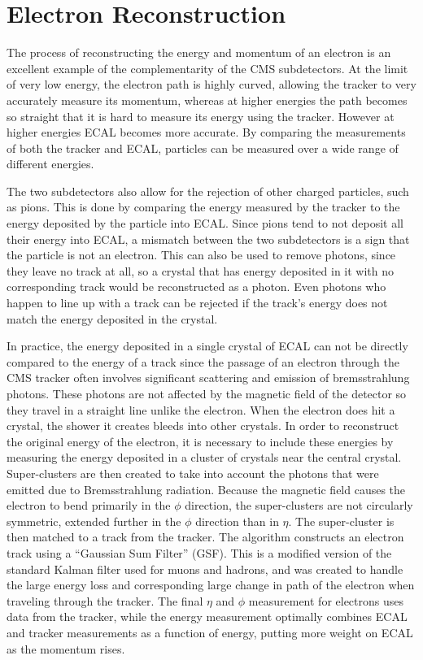 \section{Electron Reconstruction} 
The process of reconstructing the energy and momentum of an electron is an excellent example of the complementarity of the CMS subdetectors. At the limit of very low energy, the electron path is highly curved, allowing the tracker to very accurately measure its momentum, whereas at higher energies the path becomes so straight that it is hard to measure its energy using the tracker. However at higher energies ECAL becomes more accurate. By comparing the measurements of both the tracker and ECAL, particles can be measured over a wide range of different energies.

The two subdetectors also allow for the rejection of other charged particles, such as pions. This is done by comparing the energy measured by the tracker to the energy deposited by the particle into ECAL. Since pions tend to not deposit all their energy into ECAL, a mismatch between the two subdetectors is a sign that the particle is not an electron. This can also be used to remove photons, since they leave no track at all, so a crystal that has energy deposited in it with no corresponding track would be reconstructed as a photon. Even photons who happen to line up with a track can be rejected if the track's energy does not match the energy deposited in the crystal.

In practice, the energy deposited in a single crystal of ECAL can not be directly compared to the energy of a track since the passage of an electron through the CMS tracker often involves significant scattering and emission of bremsstrahlung photons. These photons are not affected by the magnetic field of the detector so they travel in a straight line unlike the electron. When the electron does hit a crystal, the shower it creates bleeds into other crystals. In order to reconstruct the original energy of the electron, it is necessary to include these energies by measuring the energy deposited in a cluster of crystals near the central crystal. Super-clusters are then created to take into account the photons that were emitted due to Bremsstrahlung radiation. Because the magnetic field causes the electron to bend primarily in the  $\phi$ direction, the super-clusters are not circularly symmetric, extended further in the $\phi$ direction than in $\eta$. The super-cluster is then matched to a track from the tracker. The algorithm constructs an electron track using a “Gaussian Sum Filter” (GSF)\cite{adam_2005}. This is a modified version of the standard Kalman filter used for muons and hadrons, and was created to handle the large energy loss and corresponding large change in path of the electron when traveling through the tracker. The final $\eta$ and $\phi$ measurement for electrons uses data from the tracker, while the energy measurement optimally combines ECAL and tracker measurements as a function of energy, putting more weight on ECAL as the momentum rises.
